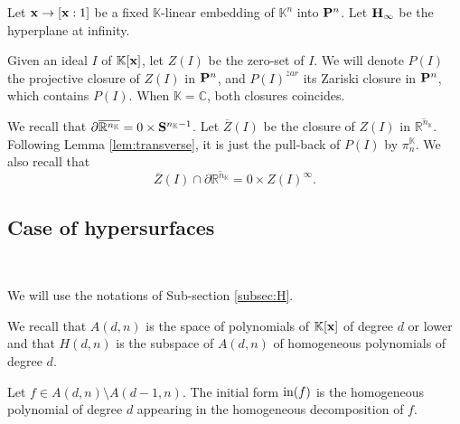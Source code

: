 \documentclass[11pt]{amsart}
\newcommand{\field}[1]{\mathbb{#1}}
\newcommand{\C}{\field{C}}
\newcommand{\K}{\field{K}}
\newcommand{\R}{\field{R}}
\newcommand{\bH}{{\bf H}}
\newcommand{\bP}{{\bf P}}
\newcommand{\bS}{{\bf S}}
\newcommand{\bx}{{\bf x}}
\newcommand{\dd}{{\partial}}
\newcommand{\ini}{{\rm in}}
\newcommand{\Kn}{{\K^n}}
\newcommand{\Zbar}{\overline{Z}}
\numberwithin{equation}{section}
\numberwithin{equation}{section}
\begin{document}
\bigskip
Let $\bx \to [\bx:1]$ be a fixed $\K$-linear embedding of $\Kn$ into $\bP^n$.
Let $\bH_\infty$ be the hyperplane at infinity.

Given an ideal $I$ of $\K[\bx]$, let $Z(I)$ be the zero-set of $I$. 
We will denote $P(I)$ the projective closure of $Z(I)$ in $\bP^n$,
and $P(I)^{zar}$ its Zariski closure in $\bP^n$, which contains $P(I)$. 
When $\K =\C$, both closures coincides.  

\bigskip
We recall that $\dd\overline{\R^{n_\K}}  = 0\times \bS^{n_\K-1}$.
Let $\Zbar(I)$ be the closure of $Z(I)$ in $\overline{\R^{n_\K}}$.
Following Lemma \ref{lem:transverse}, it is just the pull-back of $P(I)$
by $\pi_n^\K$. We also recall that 
$$
\Zbar(I) \cap \dd \overline{\R^{n_\K}} = 0 \times Z(I)^\infty.
$$

%
%
%
%
%
%
%
%
%
%
\subsection{Case of hypersurfaces}\label{subsec:hyper-LNE}
$ $ 

We will use the notations of Sub-section \ref{subsec:H}. 

\bigskip
We recall that $A(d,n)$ is the space of polynomials of $\K[\bx]$ of
degree $d$ or lower and that $H(d,n)$ is the subspace of $A(d,n)$ of 
homogeneous polynomials of degree $d$. 

Let $f \in A(d,n) \setminus A(d-1,n)$. The initial form $\ini(f)$ is the
homogeneous polynomial of degree $d$ appearing in the homogeneous 
decomposition of $f$. 
\end{document}
